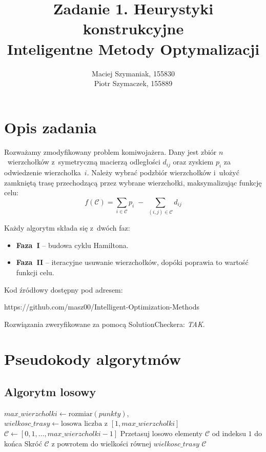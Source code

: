 \documentclass[11pt,a4paper]{article}
\title{Zadanie 1. Heurystyki konstrukcyjne\\[0.3em]
\large Inteligentne Metody Optymalizacji}
\author{Maciej Szymaniak, 155830 \\ Piotr Szymaczek, 155889}
\begin{document}
\maketitle

\section{Opis zadania}

Rozważamy zmodyfikowany problem komiwojażera. Dany jest zbiór $n$~wierzchołków z~symetryczną macierzą odległości $d_{ij}$ oraz zyskiem $p_i$ za odwiedzenie wierzchołka~$i$. Należy wybrać podzbiór wierzchołków i~ułożyć zamkniętą trasę przechodzącą przez wybrane wierzchołki, maksymalizując funkcję celu:
\[
    f(\mathcal{C}) = \sum_{i \in \mathcal{C}} p_i \;-\; \sum_{(i,j) \in \mathcal{C}} d_{ij}
\]

Każdy algorytm składa się z~dwóch faz:
\begin{itemize}
    \item \textbf{Faza~I} -- budowa cyklu Hamiltona.
    \item \textbf{Faza~II} -- iteracyjne usuwanie wierzchołków, dopóki poprawia to wartość funkcji celu.
\end{itemize}

Kod źródłowy dostępny pod adresem: 

https://github.com/masz00/Intelligent-Optimization-Methods

Rozwiązania zweryfikowane za pomocą SolutionCheckera: \textit{TAK}.

\section{Pseudokody algorytmów}

\subsection{Algorytm losowy}

\begin{algorithm}[H]
\caption{Rozwiązanie losowe}
\BlankLine
$\mathit{max\_wierzcholki} \leftarrow \text{rozmiar}(\mathit{punkty})$, \quad $\mathit{wielkosc\_trasy} \leftarrow \text{losowa liczba z }[1, \mathit{max\_wierzcholki}]$\;
$\mathcal{C} \leftarrow [0, 1, \dots, \mathit{max\_wierzcholki}-1]$\;
Przetasuj losowo elementy $\mathcal{C}$ od indeksu $1$ do końca\;
Skróć $\mathcal{C}$ z powrotem do wielkości równej $\mathit{wielkosc\_trasy}$\;
\KwReturn $\mathcal{C}$\;
\end{algorithm}
\end{document}
